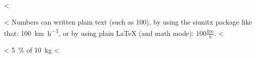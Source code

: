 <%

<%
Numbers can written plain text (such as 100), by using the siunitx package like that:
\SI{100}{\km\per\hour},
or by using plain \LaTeX{} (and math mode):
$100 \frac{\mathit{km}}{h}$.
<%

<%
\SI{5}{\percent} of \SI{10}{kg}
<%

